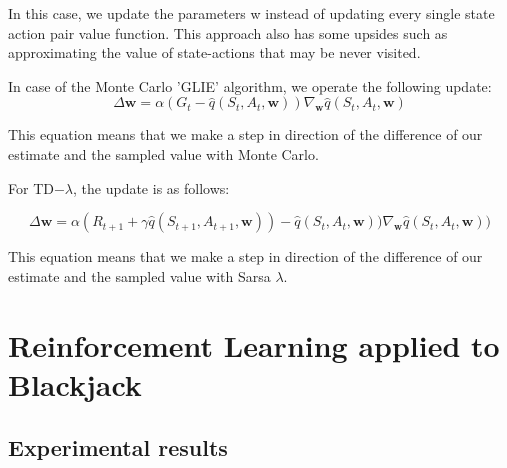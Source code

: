 \documentclass[12pt,a4paper]{article}
\begin{document}
In this case, we update the parameters w instead of updating every single state action pair value function. This approach also has some upsides such as approximating the value of state-actions that may be never visited.

In case of the Monte Carlo 'GLIE' algorithm, we operate the following update:
\begin{equation}
\Delta \textbf{w}=\alpha (G_{t} - \hat{q}(S_{t}, A_{t}, \textbf{w}) )\nabla_{\textbf{w}}\hat{q}(S_{t}, A_{t}, \textbf{w})
\end{equation}

This equation means that we make a step in direction of the difference of our estimate and the sampled value with Monte Carlo.

For TD$-\lambda$, the update is as follows:

\begin{equation}
\Delta \textbf{w}=\alpha (R_{t+1} + \gamma \hat{q}(S_{t+1}, A_{t+1}, \textbf{w}) ) - \hat{q}(S_{t}, A_{t}, \textbf{w}) )\nabla_{\textbf{w}}\hat{q}(S_{t}, A_{t}, \textbf{w}) )
\end{equation}


This equation means that we make a step in direction of the difference of our estimate and the sampled value with Sarsa $\lambda$.

\newpage
\section{Reinforcement Learning applied to Blackjack}

\subsection{Experimental results}
\end{document}
